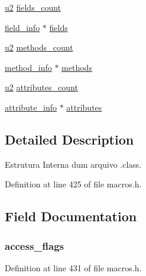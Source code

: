 \begin{DoxyCompactItemize}
\item 
\hyperlink{macros_8h_aa76d8c8015643c6a837661a10142016e}{u2} \hyperlink{struct_class_file_a8bebe0bfa4e37dde1e67c6a72af398c0}{fields\+\_\+count}
\item 
\hyperlink{structfield__info}{field\+\_\+info} $\ast$ \hyperlink{struct_class_file_ae01d16d1ab715a4f5dd1fe8254322594}{fields}
\item 
\hyperlink{macros_8h_aa76d8c8015643c6a837661a10142016e}{u2} \hyperlink{struct_class_file_a8858a4e08f7cc000e0f62459722ecce8}{methods\+\_\+count}
\item 
\hyperlink{structmethod__info}{method\+\_\+info} $\ast$ \hyperlink{struct_class_file_af0fc99630af87d96f99637f77f6bb565}{methods}
\item 
\hyperlink{macros_8h_aa76d8c8015643c6a837661a10142016e}{u2} \hyperlink{struct_class_file_aa53122439ee827a418258d52c51368c6}{attributes\+\_\+count}
\item 
\hyperlink{structattribute__info}{attribute\+\_\+info} $\ast$ \hyperlink{struct_class_file_aae221e548ab4ef529cd1a0f2fcdabb9b}{attributes}
\end{DoxyCompactItemize}


\subsection{Detailed Description}
Estrutura Interna dum arquivo .class. 

Definition at line 425 of file macros.\+h.



\subsection{Field Documentation}
\hypertarget{struct_class_file_a4cc32d48303aeaaaaea05bf77abdec59}{}
\subsubsection[{access\+\_\+flags}]{ access\+\_\+flags}\label{struct_class_file_a4cc32d48303aeaaaaea05bf77abdec59}


Definition at line 431 of file macros.\+h.

\hypertarget{struct_class_file_aae221e548ab4ef529cd1a0f2fcdabb9b}{}
